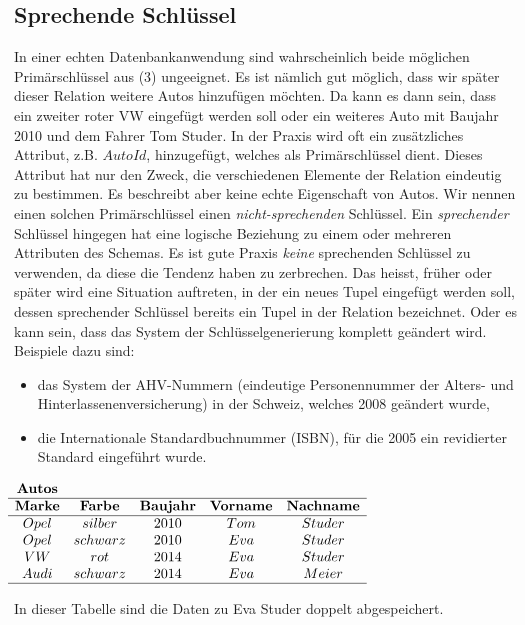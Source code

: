 \documentclass[../DatenbankenFS23.tex]{subfiles}
\begin{document}
\subsection*{Sprechende Schlüssel}
In einer echten Datenbankanwendung sind wahrscheinlich beide möglichen
Primärschlüssel aus (3) ungeeignet.
Es ist nämlich gut möglich, dass wir später dieser Relation weitere Autos
hinzufügen möchten. Da kann es dann sein, dass ein zweiter roter VW
eingefügt werden soll oder ein weiteres Auto mit Baujahr 2010 und dem
Fahrer Tom Studer.\newline
In der Praxis wird oft ein zusätzliches Attribut, z.B. $AutoId$, hinzugefügt,
welches als Primärschlüssel dient.
Dieses Attribut hat nur den Zweck, die verschiedenen Elemente der
Relation eindeutig zu bestimmen. Es beschreibt aber keine echte
Eigenschaft von Autos. Wir nennen einen solchen Primärschlüssel einen
\emph{nicht-sprechenden} Schlüssel.\newline
Ein \emph{sprechender} Schlüssel hingegen hat eine logische Beziehung zu einem
oder mehreren Attributen des Schemas.\newline
Es ist gute Praxis \emph{keine} sprechenden Schlüssel zu verwenden, da diese die
Tendenz haben zu zerbrechen. \newline
Das heisst, früher oder später wird eine Situation auftreten, in der ein
neues Tupel eingefügt werden soll, dessen sprechender Schlüssel bereits ein
Tupel in der Relation bezeichnet. Oder es kann sein, dass das System der
Schlüsselgenerierung komplett geändert wird. Beispiele dazu sind:
\begin{itemize}
    \item das System der AHV-Nummern (eindeutige Personennummer der
    Alters- und Hinterlassenenversicherung) in der Schweiz, welches 2008
    geändert wurde,
    \item die Internationale Standardbuchnummer (ISBN), für die 2005 ein
    revidierter Standard eingeführt wurde.
\end{itemize}

\begin{problem}
    \begin{center}
    $\begin{matrix}
        \textbf{Autos}\\
        \hline
        \textbf{Marke} & \textbf{Farbe} & \textbf{Baujahr} & \textbf{Vorname} & \textbf{Nachname}\\
        \hline
        Opel & silber & 2010 & Tom & Studer\\
        Opel & schwarz & 2010 & Eva & Studer\\
        VW & rot & 2014 & Eva  & Studer\\
        Audi & schwarz & 2014 & Eva  & Meier\\
        \hline
    \end{matrix}$\newline
\end{center}
    In dieser Tabelle sind die Daten zu Eva Studer doppelt abgespeichert.
\end{problem}
\end{document}
